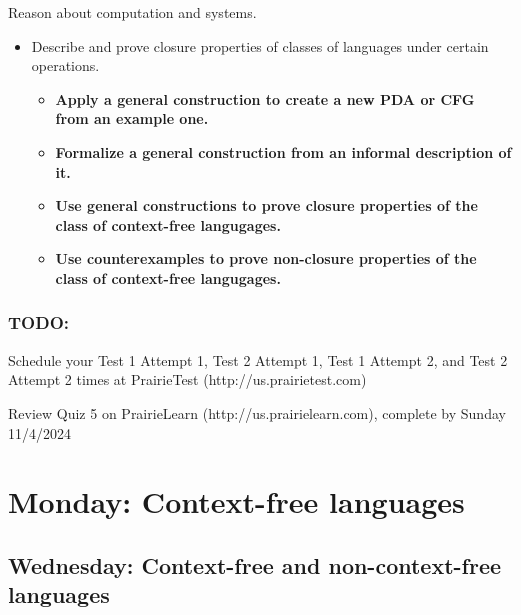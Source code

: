 \begin{itemize}
    Reason about computation and systems.
    \begin{itemize}
        \item Describe and prove closure properties of classes of languages under certain operations.
        \begin{itemize}
            \item {\bf Apply a general construction to create a new PDA or CFG from an example one.}
            \item {\bf Formalize a general construction from an informal description of it.}
            \item {\bf Use general constructions to prove closure properties of the class of context-free langugages.}
            \item {\bf Use counterexamples to prove non-closure properties of the class of context-free langugages.}
        \end{itemize}
    \end{itemize}
\end{itemize}

\vspace{-20pt}

\subsubsection*{TODO:}
\begin{list}{\itemsep-10pt}
   \item Schedule your Test 1 Attempt 1, Test 2 Attempt 1, Test 1 Attempt 2, and Test 2 Attempt 2 times 
   at PrairieTest (http://us.prairietest.com)
   \item Review Quiz 5 on PrairieLearn (http://us.prairielearn.com), complete by Sunday 11/4/2024
\end{list}

\newpage

\section*{Monday: Context-free languages}


    
\newpage
\subsection*{Wednesday: Context-free and non-context-free languages}





